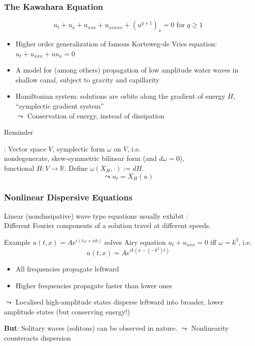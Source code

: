 \documentclass[9pt, english]{beamer}
\theoremstyle{definition}
\begin{document}
\begin{frame}
  \frametitle{The Kawahara Equation}
  \begin{block}{}
  $$u_t + u_x + u_{xxx} + u_{xxxxx} + (u^{q+1})_x = 0 \mbox{ for } q\ge 1$$
  \end{block}
  \begin{itemize}
   \item Higher order generalization of famous Korteweg-de Vries equation:\\ \hspace{2.5cm} $u_t + u_{xxx} + uu_x = 0$
   \item A model for (among others) propagation of low amplitude water waves in shallow canal, subject to gravity and
capillarity
   \item Hamiltonian system: solutions are orbits along the  gradient of
energy $H$, ``symplectic gradient system''\\
$\leadsto$ Conservation of energy, instead of dissipation
  \end{itemize}
\begin{block}{}
{\begin{bf} Reminder\end{bf}}: Vector space $V$, symplectic form $\omega$ on $V$, i.e.\\
\vspace{0.15cm}
\hspace{0.5cm} nondegenerate, skew-symmetric bilinear form (and $d\omega=0$),\\
\vspace{0.15cm} functional $H: V\rightarrow \mathbb{R}$. Define
$\omega(X_H,\cdot) := dH$.
$$\leadsto u_t=X_H(u)$$
\end{block}
\end{frame}

\begin{frame}
  \frametitle{Nonlinear Dispersive Equations}
Linear (nondissipative) wave type equations usually exhibit  :\\
\vspace{0.15cm}
\hspace{0.25cm} Different Fourier components of a solution travel at different speeds.\\
\vspace{0.15cm}
\begin{block}{Example}
$u(t,x)=Ae^{i(t\omega + xk)}$ solves Airy equation $u_t + u_{xxx} =
0$ iff $\omega = k^3$, i.e.$$u(t,x)=Ae^{ik(x -  (-k^2)t)}$$
\vspace{-0.5cm}
\begin{itemize}
 \item All frequencies propagate leftward
 \item Higher frequencies propagate faster than lower ones
\end{itemize}
$\leadsto$ Localised high-amplitude states disperse leftward into
broader, lower amplitude states (but conserving energy!)
\end{block}
\vspace{0.25cm} {\bf But}: Solitary waves (solitons) can be observed
in nature. $\leadsto$ Nonlinearity counteracts dispersion
\end{frame}
\end{document}
